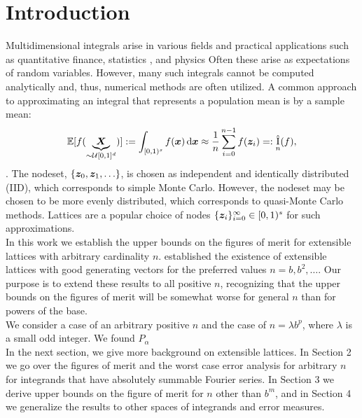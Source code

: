 \documentclass[authoryear]{elsarticle}
\newcommand{\appxintn}{\appxint_n}
\DeclareMathOperator{\appxint}{\hat{I}}
\newcommand{\FredNote}[1]{{\color{blue}#1}}
\newcommand{\LarysaNote}[1]{{\color{violet}#1}}
\begin{document}
\section{Introduction}



Multidimensional integrals arise in various fields and practical applications \LarysaNote{such as quantitative finance, statistics , and physics } \FredNote{Often these arise as expectations of random variables.}  However, many such integrals cannot be computed analytically and, thus, numerical methods are often utilized. \FredNote{A common approach to approximating an integral that represents a population mean is by a sample mean:} 
\[
\mathbb{E}[f(\underbrace{\vX}_{\sim \mathcal{U}[0,1]^d})] : = \int_{[0,1)^s} f(\vx) \, \dif \vx \approx \frac{1}{n} \sum_{i=0}^{n-1} f(\vz_i) =:\appxintn(f),
\]
\citep{DicEtal22a,Nie92,SloJoe94}.
The nodeset, $\{\boldsymbol{z}_0, \boldsymbol{z}_1, \ldots \}$, is chosen as independent and identically distributed (IID), which corresponds to simple Monte Carlo. However, the nodeset may be chosen to be more evenly distributed, which corresponds to quasi-Monte Carlo methods. Lattices are a popular choice of nodes $\{\boldsymbol{z}_i\}_{i=0}^{\infty} \in [0,1)^s$ for such approximations. \\


\LarysaNote{In this work we establish the upper bounds on the figures of merit for extensible lattices with arbitrary cardinality $n$. }
\cite{HicNie03a} established the existence of extensible lattices with good generating vectors for the preferred values $n = b, b^2, \ldots$.  Our purpose is to extend these results to all positive $n$, recognizing that the upper bounds on the figures of merit will be somewhat worse for general $n$ than for powers of the base. \\

\LarysaNote{We consider a case of an arbitrary positive $n$ and the case of $n = \lambda b^p$, where $\lambda$ is a small odd integer. We found $P_{\alpha}$  } \\

   
In the next section, we give more background on extensible lattices. In Section 2 we go over the figures of merit and the worst case error analysis for arbitrary $n$ for integrands that have absolutely summable Fourier series. In Section 3 we derive upper bounds on the figure of merit %
for $n$ other than $b^m$, and in Section 4 we generalize the results to other spaces of integrands and error measures. 
\end{document}
